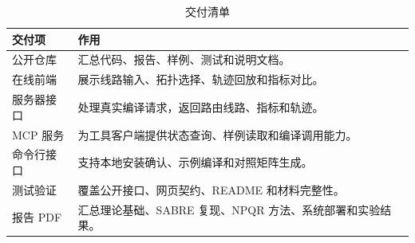 \begin{table}[H]
  \centering
  \caption{交付清单}
  \label{tab:delivery-checklist}
  \begin{tabularx}{\linewidth}{lY}
    \toprule
    交付项 & 作用 \\
    \midrule
    公开仓库 & 汇总代码、报告、样例、测试和说明文档。\\
    在线前端 & 展示线路输入、拓扑选择、轨迹回放和指标对比。\\
    服务器接口 & 处理真实编译请求，返回路由线路、指标和轨迹。\\
    MCP 服务 & 为工具客户端提供状态查询、样例读取和编译调用能力。\\
    命令行接口 & 支持本地安装确认、示例编译和对照矩阵生成。\\
    测试验证 & 覆盖公开接口、网页契约、README 和材料完整性。\\
    报告 PDF & 汇总理论基础、SABRE 复现、NPQR 方法、系统部署和实验结果。\\
    \bottomrule
  \end{tabularx}
\end{table}
